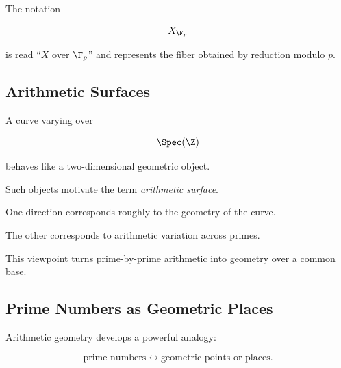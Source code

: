 \begin{centereddiagram}
\end{centereddiagram}

The notation

\[ X_{\F_p} \]

is read ``\(X\) over \(\F_p\)'' and represents the fiber obtained by
reduction modulo \(p\).

\subsection{Arithmetic Surfaces}
\label{subsec:arithmetic-surfaces}

A curve varying over

\[ \Spec(\Z) \]

behaves like a two-dimensional geometric object.

Such objects motivate the term \emph{arithmetic surface}.

One direction corresponds roughly to the geometry of the curve.

The other corresponds to arithmetic variation across primes.

This viewpoint turns prime-by-prime arithmetic into geometry over a common
base.

\subsection{Prime Numbers as Geometric Places}
\label{subsec:primes-as-geometric-places}

Arithmetic geometry develops a powerful analogy:

\[
\boxed{
\text{prime numbers}
\longleftrightarrow
\text{geometric points or places}.
}
\]

